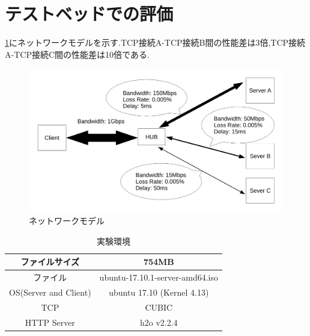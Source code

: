 \documentclass[a4j,12pt]{gradthesis_utf8}
\begin{document}
\newpage

\section{テストベッドでの評価}
\label{testbed}
\ref{networkmodel}にネットワークモデルを示す.TCP接続A-TCP接続B間の性能差は3倍,TCP接続A-TCP接続C間の性能差は10倍である.
\begin{figure}[h]
	\label{networkmodel}
	\begin{center}
		\includegraphics[width=16cm]{test_network.pdf}
		\caption{ネットワークモデル}
	\end{center}
\end{figure}

\begin{table}[htb]
	\begin{center}
		\caption{実験環境}
		\begin{tabular}{|c|c|} \hline
			ファイルサイズ & 754MB\\ \hline
			ファイル &  ubuntu-17.10.1-server-amd64.iso\\ \hline
			OS(Server and Client) & ubuntu 17.10 (Kernel 4.13)\\ \hline
			TCP & CUBIC \\ \hline
			HTTP Server & h2o v2.2.4 \\ \hline
		\end{tabular}
	\end{center}
\end{table}

\newpage
\end{document}
